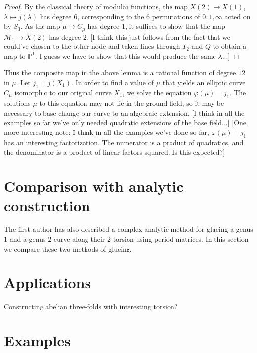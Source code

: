 \documentclass[reqno, 12pt]{amsart}
\theoremstyle{definition}
\renewcommand{\P}{\mathbb P}
\newcommand{\sss}[1]{{\color{blue} [#1]}}
\begin{document}
\begin{proof}
By the classical theory of modular functions, the map $X(2) \to X(1)$, $\lambda \mapsto j(\lambda)$ has degree $6$, corresponding to the $6$ permutations of $0, 1, \infty$ acted on by $S_3$. As the map $\mu \mapsto C_\mu$ has degree $1$, it suffices to show that the map $\mathcal{M}_1 \to X(2)$ has degree $2$. \sss{I think this just follows from the fact that we could've chosen to the other node and taken lines through $T_2$ and $Q$ to obtain a map to $\P^1$. I guess we have to show that this would produce the same $\lambda$...}
\end{proof}

Thus the composite map in the above lemma is a rational function of degree $12$ in $\mu$. Let $j_1 = j(X_1)$. In order to find a value of $\mu$ that yields an elliptic curve $C_\mu$ isomorphic to our original curve $X_1$, we solve the equation $\varphi(\mu) = j_1$. The solutions $\mu$ to this equation may not lie in the ground field, so it may be necessary to base change our curve to an algebraic extension. \sss{I think in all the examples so far we've only needed quadratic extensions of the base field...} \sss{One more interesting note: I think in all the examples we've done so far, $\varphi(\mu) - j_1$ has an interesting factorization. The numerator is a product of quadratics, and the denominator is a product of linear factors squared. Is this expected?}

\section{Comparison with analytic construction}
The first author has also described a complex analytic method for glueing a genus $1$ and a genus $2$ curve along their $2$-torsion using period matrices. In this section we compare these two methods of glueing.

\section{Applications}
Constructing abelian three-folds with interesting torsion?

\section{Examples}

%


\end{document}
